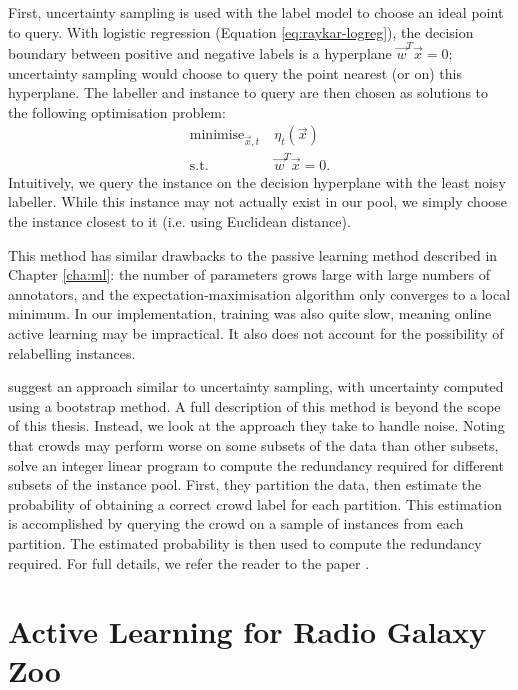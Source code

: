     First, uncertainty sampling is used with the label model to choose an ideal
    point to query. With logistic regression (Equation \ref{eq:raykar-logreg}),
    the decision boundary between positive and negative labels is a hyperplane
    $\vec w^T \vec x = 0$; uncertainty sampling would choose to query the point
    nearest (or on) this hyperplane. The labeller and instance to query are then
    chosen as solutions to the following optimisation problem:
    \begin{align*}
        \text{minimise}_{\vec x, t}\ & \eta_t(\vec x)\\
        \text{s.t. } & \vec w^T \vec x = 0.
    \end{align*}
    Intuitively, we query the instance on the decision hyperplane with the least
    noisy labeller. While this instance may not actually exist in our pool, we
    simply choose the instance closest to it (i.e. using Euclidean distance).

    This method has similar drawbacks to the \citeauthor{yan10} passive learning
    method described in Chapter \ref{cha:ml}: the number of parameters grows
    large with large numbers of annotators, and the expectation-maximisation
    algorithm only converges to a local minimum. In our implementation, training
    was also quite slow, meaning online active learning may be impractical. It
    also does not account for the possibility of relabelling instances.

    \citet{mozafari12} suggest an approach similar to uncertainty sampling, with
    uncertainty computed using a bootstrap method. A full description of this
    method is beyond the scope of this thesis. Instead, we look at the approach
    they take to handle noise. Noting that crowds may perform worse on some
    subsets of the data than other subsets, \citeauthor{mozafari12} solve an
    integer linear program to compute the redundancy required for different
    subsets of the instance pool. First, they partition the data, then estimate
    the probability of obtaining a correct crowd label for each partition. This
    estimation is accomplished by querying the crowd on a sample of instances
    from each partition. The estimated probability is then used to compute the
    redundancy required. For full details, we refer the reader to the paper
    \citep{mozafari12}.

\section{Active Learning for Radio Galaxy Zoo}
\label{sec:rgz-al-general}

